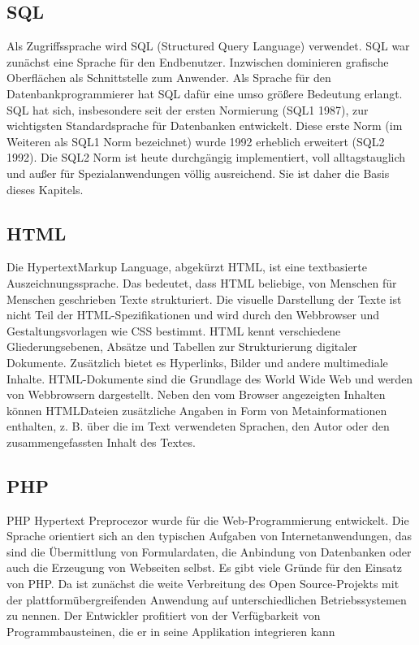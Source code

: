 \subsection{SQL}
\cite{schicker2017datenbanken}
Als Zugriffssprache wird SQL (Structured Query Language) verwendet. SQL war zunächst
eine Sprache für den Endbenutzer. Inzwischen dominieren grafische Oberflächen
als Schnittstelle zum Anwender. Als Sprache für den Datenbankprogrammierer hat SQL
dafür eine umso größere Bedeutung erlangt. SQL hat sich, insbesondere seit der ersten
Normierung (SQL1 1987), zur wichtigsten Standardsprache für Datenbanken entwickelt.
Diese erste Norm (im Weiteren als SQL1 Norm bezeichnet) wurde 1992 erheblich erweitert
(SQL2 1992). Die SQL2 Norm ist heute durchgängig implementiert, voll alltagstauglich
und außer für Spezialanwendungen völlig ausreichend. Sie ist daher die Basis dieses
Kapitels.
\subsection{HTML}
\cite{plenk2017angewandte}
Die HypertextMarkup Language, abgekürzt HTML, ist eine textbasierte
Auszeichnungssprache. Das bedeutet, dass HTML beliebige, von Menschen
für Menschen geschrieben Texte strukturiert. Die visuelle Darstellung
der Texte ist nicht Teil der HTML-Spezifikationen und wird durch
den Webbrowser und Gestaltungsvorlagen wie CSS bestimmt.
HTML kennt verschiedene Gliederungsebenen, Absätze und Tabellen
zur Strukturierung digitaler Dokumente. Zusätzlich bietet es Hyperlinks,
Bilder und andere multimediale Inhalte. HTML-Dokumente sind
die Grundlage des World Wide Web und werden von Webbrowsern dargestellt.
Neben den vom Browser angezeigten Inhalten können HTMLDateien
zusätzliche Angaben in Form von Metainformationen enthalten,
z. B. über die im Text verwendeten Sprachen, den Autor oder den zusammengefassten
Inhalt des Textes.
\subsection{PHP}
\cite{pomaska2012webseiten-programmierung}
PHP Hypertext Preprocezor wurde für die Web-Programmierung entwickelt. Die
Sprache orientiert sich an den typischen Aufgaben von Internetanwendungen, das
sind die Übermittlung von Formulardaten, die Anbindung von Datenbanken oder
auch die Erzeugung von Webseiten selbst. Es gibt viele Gründe für den Einsatz
von PHP. Da ist zunächst die weite Verbreitung des Open Source-Projekts mit der
plattformübergreifenden Anwendung auf unterschiedlichen Betriebssystemen zu
nennen. Der Entwickler profitiert von der Verfügbarkeit von Programmbausteinen,
die er in seine Applikation integrieren kann

